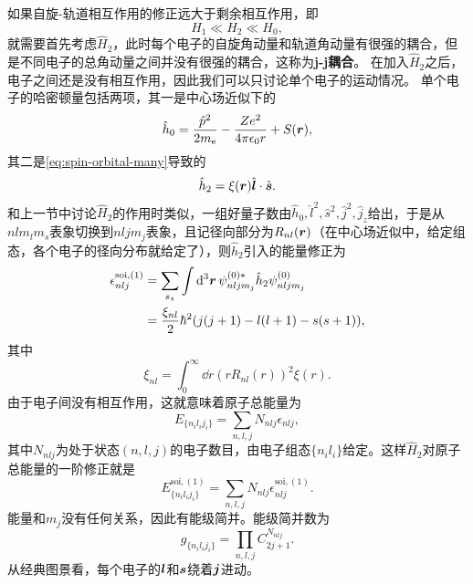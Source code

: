 \documentclass[UTF8, a4paper]{ctexart}
\begin{document}
如果自旋-轨道相互作用的修正远大于剩余相互作用，即
\begin{equation}
    H_1 \ll H_2 \ll H_0,
\end{equation}
就需要首先考虑$\hat{H}_2$，此时每个电子的自旋角动量和轨道角动量有很强的耦合，但是不同电子的总角动量之间并没有很强的耦合，这称为\textbf{j-j耦合}。
在加入$\hat{H}_2$之后，电子之间还是没有相互作用，因此我们可以只讨论单个电子的运动情况。
单个电子的哈密顿量包括两项，其一是中心场近似下的
\[
    \hat{h}_0 = \frac{\hat{p}^2}{2m_\text{e}} - \frac{Z e^2}{4\pi \epsilon_0 r} + S(\vb*{r}),
\]
其二是\eqref{eq:spin-orbital-many}导致的
\[
    \hat{h}_2 = \xi(\vb*{r}) \hat{\vb*{l}} \cdot \hat{\vb*{s}}.
\]
和上一节中讨论$\hat{H}_2$的作用时类似，一组好量子数由$\hat{h}_0, \hat{l}^2, \hat{s}^2, \hat{j}^2, \hat{j}_z$给出，于是从$nl m_l m_s$表象切换到$nlj m_j$表象，且记径向部分为$R_{nl}(\vb*{r})$（在中心场近似中，给定组态，各个电子的径向分布就给定了），则$\hat{h}_2$引入的能量修正为
\begin{equation}
    \begin{aligned}
        \epsilon_{nlj}^{\text{soi}, (1)} &= \sum_{s_z} \int \dd[3]{\vb*{r}} \psi^{(0)*}_{nlj m_j} \hat{h}_2 \psi^{(0)}_{nlj m_j} \\
        &= \frac{\xi_{nl}}{2} \hbar^2 (j(j+1) - l(l+1) - s(s+1)),
    \end{aligned}
\end{equation}
其中
\begin{equation}
    \xi_{nl} = \int_0^\infty \dd{r} (r R_{nl}(r))^2 \xi(r).
\end{equation}
由于电子间没有相互作用，这就意味着原子总能量为
\[
    E_{\{n_i l_i j_i\}} = \sum_{n, l, j} N_{nlj} \epsilon_{nlj},
\]
其中$N_{nlj}$为处于状态$(n, l, j)$的电子数目，由电子组态$\{n_i l_i\}$给定。这样$\hat{H}_2$对原子总能量的一阶修正就是
\begin{equation}
    E^{\text{soi}, (1)}_{\{n_i l_i j_i\}} = \sum_{n, l, j} N_{nlj} \epsilon_{nlj}^{\text{soi}, (1)}.
\end{equation}
能量和$m_j$没有任何关系，因此有能级简并。能级简并数为
\begin{equation}
    g_{\{n_i l_i j_i\}} = \prod_{n, l, j} C_{2j+1}^{N_{nlj}}.
\end{equation}
从经典图景看，每个电子的$\vb*{l}$和$\vb*{s}$绕着$\vb*{j}$进动。
\end{document}
